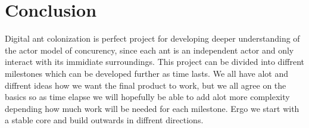 \documentclass[a4paper]{article}
\begin{document}
\section{Conclusion}
Digital ant colonization is perfect project for developing deeper understanding
of the actor model of concurency, since each ant is an independent actor and
only interact with its immidiate surroundings. This project can be divided into
diffrent milestones which can be developed further as time lasts. We all have
alot and diffrent ideas how we want the final product to work, but we all agree
on the basics so as time elapse we will hopefully be able to add alot more
complexity depending how much work will be needed for each milestone. Ergo we
start with a stable core and build outwards in diffrent directions.
\end{document}
